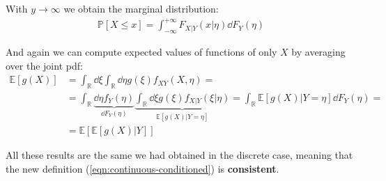 \documentclass[../template.tex]{subfiles}
\begin{document}
With $y \to \infty$ we obtain the marginal distribution:
\begin{align*}
    \mathbb{P}[X \leq x] = \int_{-\infty}^{+\infty} F_{X|Y}(x|\eta) \dd{F_Y(\eta)}
\end{align*}

And again we can compute expected values of functions of only $X$ by averaging over the joint pdf:
\begin{align*}
    \mathbb{E}[g(X)] &= \int_{\mathbb{R}} \dd{\xi}\int_{\mathbb{R}} \dd{\eta} g(\xi) f_{XY}(X,\eta) =\\
    &= \int_{\mathbb{R}} \underbrace{\dd{\eta} f_Y(\eta)}_{\dd{F_Y(\eta)}} \underbrace{\int_{\mathbb{R}} \dd{\xi} g(\xi) f_{X|Y}(\xi | \eta)}_{\mathbb{E}[g(X)|Y=\eta]} = \int_{\mathbb{R}} \mathbb{E}[g(X)|Y=\eta] \dd{F_Y(\eta)} =\\
    &= \mathbb{E}[\mathbb{E}[g(X)|Y]]
\end{align*}

All these results are the same we had obtained in the discrete case, meaning that the new definition (\ref{eqn:continuous-conditioned}) is \textbf{consistent}. 
\end{document}
